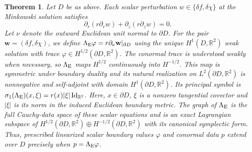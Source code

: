 \documentclass[amsmath,amsfonts,amssymb,aps,pra,superscriptaddress,10pt]{revtex4-2}
\numberwithin{equation}{section}
\theoremstyle{plain}
\newtheorem{theorem}{Theorem}
\theoremstyle{definition}
\theoremstyle{remark}
\theoremstyle{definition}
\begin{document}
\begin{theorem}
Let $D$ be as above. Each scalar perturbation $w\in\{\delta f,\delta\chi\}$ at the Minkowski solution satisfies
\begin{equation}\label{linErnsteqn}
\partial_r(r\partial_r w)+\partial_z(r\partial_z w)=0.
\end{equation}
Let $\nu$ denote the outward Euclidean unit normal to $\partial D$. For the pair $\mathbf{w}=(\delta f,\delta\chi)$, we define $\Lambda_{\rm{E}}\varphi=r\partial_\nu\mathbf{w}|_{\partial D}$ using the unique $H^1(D,\mathbb{R}^2)$ weak solution with trace $\varphi\in H^{1/2}(\partial D,\mathbb{R}^2)$. The conormal trace is understood weakly when necessary, so $\Lambda_{\rm{E}}$ maps $H^{1/2}$ continuously into $H^{-1/2}$. This map is symmetric under boundary duality and its natural realization on $L^2(\partial D,\mathbb{R}^2)$ is nonnegative and self-adjoint with domain $H^1(\partial D,\mathbb{R}^2)$. Its principal symbol is $\sigma_1(\Lambda_{\rm{E}})(x,\xi)=r(x)|\xi|\operatorname{Id}_{\mathbb{R}^2}$. Here, $x\in\partial D$, $\xi$ is a nonzero tangential covector and $|\xi|$ is its norm in the induced Euclidean boundary metric. The graph of $\Lambda_{\rm{E}}$ is the full Cauchy-data space of these scalar equations and is an exact Lagrangian subspace of $H^{1/2}(\partial D,\mathbb{R}^2)\oplus H^{-1/2}(\partial D,\mathbb{R}^2)$ with its canonical symplectic form. Thus, prescribed linearized scalar boundary values $\varphi$ and conormal data $p$ extend over $D$ precisely when $p=\Lambda_{\rm{E}}\varphi$.
\end{theorem}
\end{document}

